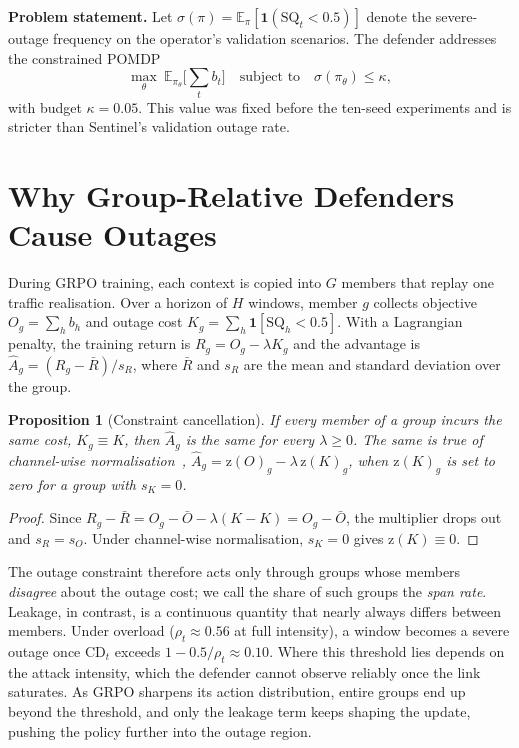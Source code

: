 \documentclass[conference]{IEEEtran}
\newtheorem{proposition}{Proposition}
\begin{document}
\textbf{Problem statement.} Let $\sigma(\pi)=\mathbb{E}_\pi[\mathbf{1}(\mathrm{SQ}_t<0.5)]$ denote the severe-outage frequency on the operator's validation scenarios. The defender addresses the constrained POMDP
\begin{equation}
\max_\theta\ \mathbb{E}_{\pi_\theta}\Big[\textstyle\sum_t b_t\Big]\quad\text{subject to}\quad \sigma(\pi_\theta)\le\kappa ,
\label{eq:cpomdp}
\end{equation}
with budget $\kappa=0.05$. This value was fixed before the ten-seed experiments and is stricter than Sentinel's validation outage rate.

\section{Why Group-Relative Defenders Cause Outages}
\label{sec:mechanism}
During GRPO training, each context is copied into $G$ members that replay one traffic realisation. Over a horizon of $H$ windows, member $g$ collects objective $O_g=\sum_h b_h$ and outage cost $K_g=\sum_h\mathbf{1}[\mathrm{SQ}_h<0.5]$. With a Lagrangian penalty, the training return is $R_g=O_g-\lambda K_g$ and the advantage is $\hat A_g=(R_g-\bar R)/s_R$, where $\bar R$ and $s_R$ are the mean and standard deviation over the group.

\begin{proposition}[Constraint cancellation]\label{prop:cancel}
If every member of a group incurs the same cost, $K_g\equiv K$, then $\hat A_g$ is the same for every $\lambda\ge0$. The same is true of channel-wise normalisation~\cite{girgis2026cgrpo}, $\hat A_g=\mathrm{z}(O)_g-\lambda\,\mathrm{z}(K)_g$, when $\mathrm{z}(K)_g$ is set to zero for a group with $s_K=0$.
\end{proposition}
\begin{proof}
Since $R_g-\bar R=O_g-\bar O-\lambda(K-K)=O_g-\bar O$, the multiplier drops out and $s_R=s_O$. Under channel-wise normalisation, $s_K=0$ gives $\mathrm{z}(K)\equiv0$.
\end{proof}

The outage constraint therefore acts only through groups whose members \emph{disagree} about the outage cost; we call the share of such groups the \emph{span rate}. Leakage, in contrast, is a continuous quantity that nearly always differs between members. Under overload ($\rho_t\approx0.56$ at full intensity), a window becomes a severe outage once $\mathrm{CD}_t$ exceeds $1-0.5/\rho_t\approx0.10$. Where this threshold lies depends on the attack intensity, which the defender cannot observe reliably once the link saturates. As GRPO sharpens its action distribution, entire groups end up beyond the threshold, and only the leakage term keeps shaping the update, pushing the policy further into the outage region.
\end{document}
